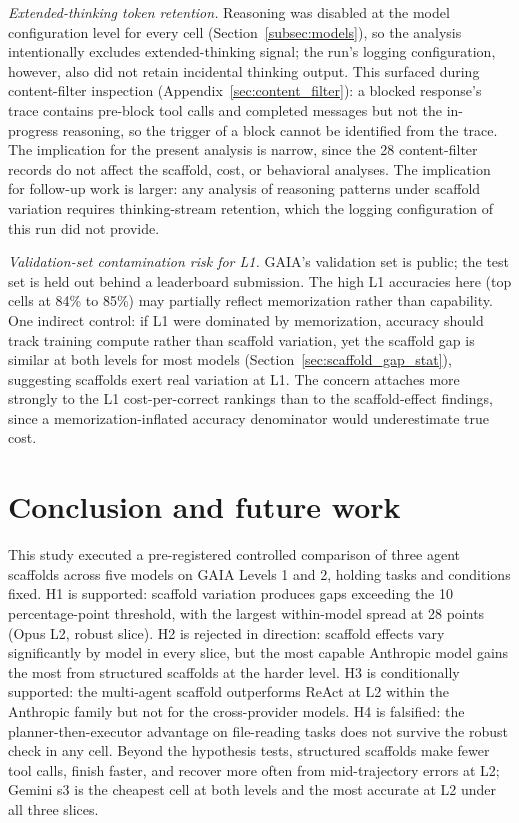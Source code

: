 \documentclass[10pt]{article} %
\begin{document}
    \textit{Extended-thinking token retention.}\label{sec:limitation_thinking} Reasoning was disabled at the model configuration level for every cell (Section~\ref{subsec:models}), so the analysis intentionally excludes extended-thinking signal; the run's logging configuration, however, also did not retain incidental thinking output. This surfaced during content-filter inspection (Appendix~\ref{sec:content_filter}): a blocked response's trace contains pre-block tool calls and completed messages but not the in-progress reasoning, so the trigger of a block cannot be identified from the trace. The implication for the present analysis is narrow, since the 28 content-filter records do not affect the scaffold, cost, or behavioral analyses. The implication for follow-up work is larger: any analysis of reasoning patterns under scaffold variation requires thinking-stream retention, which the logging configuration of this run did not provide.

    \textit{Validation-set contamination risk for L1.}\label{sec:limitation_contamination} GAIA's validation set is public; the test set is held out behind a leaderboard submission. The high L1 accuracies here (top cells at 84\% to 85\%) may partially reflect memorization rather than capability. One indirect control: if L1 were dominated by memorization, accuracy should track training compute rather than scaffold variation, yet the scaffold gap is similar at both levels for most models (Section~\ref{sec:scaffold_gap_stat}), suggesting scaffolds exert real variation at L1. The concern attaches more strongly to the L1 cost-per-correct rankings than to the scaffold-effect findings, since a memorization-inflated accuracy denominator would underestimate true cost.

\section{Conclusion and future work}

    This study executed a pre-registered controlled comparison of three agent scaffolds across five models on GAIA Levels 1 and 2, holding tasks and conditions fixed. H1 is supported: scaffold variation produces gaps exceeding the 10 percentage-point threshold, with the largest within-model spread at 28 points (Opus L2, robust slice). H2 is rejected in direction: scaffold effects vary significantly by model in every slice, but the most capable Anthropic model gains the most from structured scaffolds at the harder level. H3 is conditionally supported: the multi-agent scaffold outperforms ReAct at L2 within the Anthropic family but not for the cross-provider models. H4 is falsified: the planner-then-executor advantage on file-reading tasks does not survive the robust check in any cell. Beyond the hypothesis tests, structured scaffolds make fewer tool calls, finish faster, and recover more often from mid-trajectory errors at L2; Gemini s3 is the cheapest cell at both levels and the most accurate at L2 under all three slices.
\end{document}
